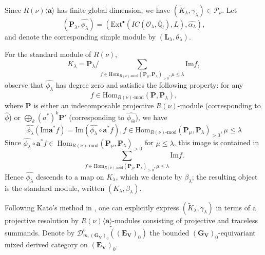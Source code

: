 \documentclass[10pt,a4paper]{amsart}
\begin{document}
Since $R(\nu)\langle\mathbf{a}\rangle$ has finite global dimension, we have $(\widetilde{K}_{\lambda}, \gamma_{\lambda}) \in \mathcal{P}_{\nu}$. Let
\[
(\mathbf{P}_{\lambda}, \hat{\phi_{\lambda}}) = (\mathrm{Ext}^{\bullet}(IC(\mathcal{O}_{\lambda}, \overline{\mathbb{Q}}_l), L), \hat{\alpha_{\lambda}}),
\]
and denote the corresponding simple module by $(\mathbf{L}_{\lambda}, \theta_{\lambda})$.

For the standard module of $R(\nu)$,
\[
K_{\lambda} = \mathbf{P}_{\lambda} \big/ \sum_{f \in \mathrm{Hom}_{R(\nu)\text{-}\mathrm{mod}}(\mathbf{P}_{\mu}, \mathbf{P}_{\lambda})_{>0}, \mu \leq \lambda} \mathrm{Im} f,
\]
observe that $\hat{\phi_{\lambda}}$ has degree zero and satisfies the following property: for any
\[
f \in \mathrm{Hom}_{R(\nu)\text{-}\mathrm{mod}}(\mathbf{P}, \mathbf{P}_{\lambda}),
\]
where $\mathbf{P}$ is either an indecomposable projective $R(\nu)$-module (corresponding to $\hat{\phi}$) or $\bigoplus_k (a^*)^k \mathbf{P}'$ (corresponding to $\hat{\phi_{\oplus}}$), we have
\[
\hat{\phi_{\lambda}}(\mathrm{Im} \mathbf{a}^*f)=\mathrm{Im}(\hat{\phi_{\lambda}}\circ \mathbf{a}^*f),f \in \mathrm{Hom}_{R(\nu)\text{-}\mathrm{mod}}(\mathbf{P}_{\mu}, \mathbf{P}_{\lambda})_{>0}, \mu \leq \lambda
\]
Since $\hat{\phi_{\lambda}}\circ \mathbf{a}^*f\in\ \mathrm{Hom}_{R(\nu)\text{-}\mathrm{mod}}(\mathbf{P}_{\mu}, \mathbf{P}_{\lambda})_{>0}$ for $\mu \leq \lambda$, this image is contained in
\[
\sum_{f \in \mathrm{Hom}_{R(\nu)\text{-}\mathrm{mod}}(\mathbf{P}_{\mu}, \mathbf{P}_{\lambda})_{>0}, \mu \leq \lambda} \mathrm{Im} f.
\]
Hence $\hat{\phi_{\lambda}}$ descends to a map on $K_{\lambda}$, which we denote by $\beta_{\lambda}$; the resulting object is the standard module, written $(K_{\lambda}, \beta_{\lambda}).$ 

Following Kato's method in \cite{cd088214-009e-3813-9a86-97f9a299a24c}, one can explicitly express $(\widetilde{K}_{\lambda}, \gamma_{\lambda})$ in terms of a projective resolution by $R(\nu)\langle\mathbf{a}\rangle$-modules consisting of projective and traceless summands. Denote by $\widetilde{\mathcal{D}^{b}_{m,(\mathbf{G}_{\mathbf{V}})_0}((\mathbf{E}_{\mathbf{V}})_0)}$ the bounded $(\mathbf{G}_{\mathbf{V}})_0$-equivariant mixed derived category on $(\mathbf{E}_{\mathbf{V}})_0$.
\end{document}
